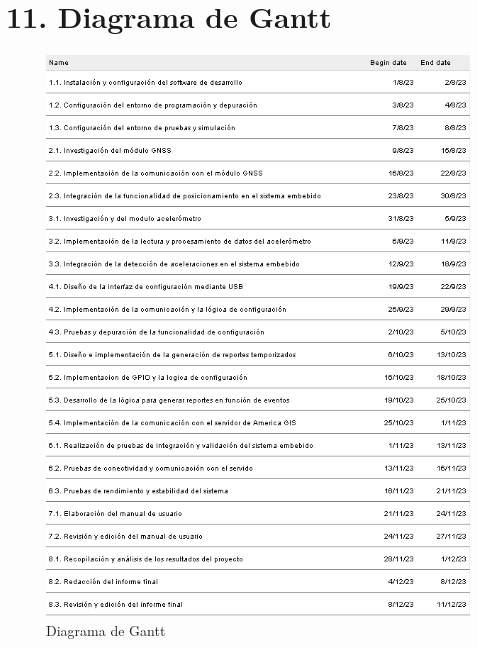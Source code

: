 \documentclass[
11pt, %
codirector, %
]{charter}
\begin{document}
\section{11. Diagrama de Gantt}
\label{sec:gantt}
\begin{figure}[htpb]
\centering 
\includegraphics[height=0.75\textheight]{./Figuras/gantt_rotado2.png}
\caption{Diagrama de Gantt}

\label{fig:diagGantt}
\end{figure}
\pagebreak
\end{document}

